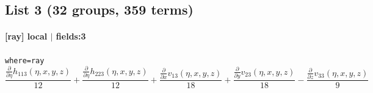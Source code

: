 \subsection*{List 3 (32 groups, 359 terms)}
\paragraph{[ray] local $|$ fields:3} \texttt{where=ray}
\begin{dmath*}\frac{\frac{\partial}{\partial \eta} h_{11 3}{\left(\eta,x,y,z \right)}}{12} + \frac{\frac{\partial}{\partial \eta} h_{22 3}{\left(\eta,x,y,z \right)}}{12} + \frac{\frac{\partial}{\partial x} v_{1 3}{\left(\eta,x,y,z \right)}}{18} + \frac{\frac{\partial}{\partial y} v_{2 3}{\left(\eta,x,y,z \right)}}{18} - \frac{\frac{\partial}{\partial z} v_{3 3}{\left(\eta,x,y,z \right)}}{9}\end{dmath*}
